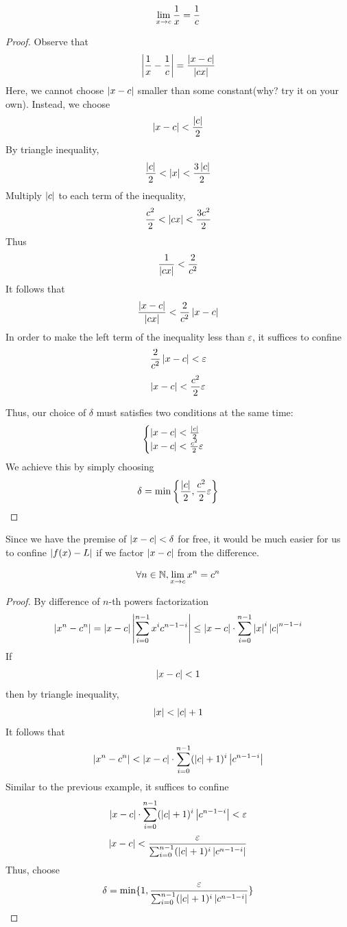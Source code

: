 \documentclass[a4paper,12pt]{article}
\begin{document}
\newpage
\begin{example}[Harder]
    \[\lim_{x\rightarrow c} {\frac{1}{x}}=\frac{1}{c}\]
    \begin{proof}        
        Observe that
        \[\left\lvert \frac{1}{x }-\frac{1}{c}\right\rvert=\frac{\left\lvert x-c\right\rvert}{\left\lvert cx\right\rvert}\]
        Here, we cannot choose \(\left\lvert x-c\right\rvert\) smaller than some constant(why? try it on your own). Instead,
        we choose \[\left\lvert x-c\right\rvert<\frac{\left\lvert c \right\rvert}{2 }\]
        By triangle inequality,
        \[\frac{\left\lvert c \right\rvert}{2 }<\left\lvert x\right\rvert<\frac{3\left\lvert c \right\rvert}{2 }\]
        Multiply \(\left\lvert c\right\rvert\) to each term of the inequality,
        \[\frac{c^2}{2 }<\left\lvert cx\right\rvert<\frac{3c^2}{2 }\]
        Thus
        \[\frac{1 }{\left\lvert cx \right\rvert}<\frac{2 }{c^2 }\]
        It follows that 
        \[\frac{\left\lvert x-c \right\rvert}{\left\lvert cx \right\rvert}<\frac{2}{c^2}\left\lvert x-c \right\rvert\]
        In order to make the left term of the inequality less than \(\varepsilon\), 
        it suffices to confine 
        \[\frac{2}{c^2}\left\lvert x-c\right\rvert<\varepsilon\]
        \[\left\lvert x-c\right\rvert<\frac{c^2}{2}\varepsilon\]

        Thus, our choice of \(\delta\) must satisfies two conditions at the same time:
        \begin{equation*}
            \begin{cases}
                \left\lvert x-c\right\rvert<\frac{\left\lvert c \right\rvert}{2 } \\
                \left\lvert x-c\right\rvert<\frac{c^2}{2}\varepsilon
            \end{cases}
        \end{equation*}
        We achieve this by simply choosing
        \[\delta=\min\left\{\frac{\left\lvert c \right\rvert}{2 },\frac{c^2}{2}\varepsilon\right\}\]

    \end{proof}
\end{example}

\begin{remark}
    Since we have the premise of \(\left\lvert x-c \right\rvert<\delta\) for free, it would be much easier for us to 
    confine \(\left\lvert f(x)-L\right\rvert\) if we factor \(\left\lvert x-c\right\rvert\) from the difference.
\end{remark}

\newpage

\begin{example}
    \[\forall n\in\mathbb{N}, \lim_{x\rightarrow c } {x^n }=c^n\]
    \begin{proof}
        By difference of \(n\)-th powers factorization
        \[\left\lvert x^n-c^n \right\rvert=\left\lvert x-c\right\rvert\left\lvert \sum_{i=0}^{n-1 }x^i c^{n-1-i}\right\rvert\le \left\lvert x-c \right\rvert\cdot\sum_{i=0}^{n-1 }\left\lvert x\right\rvert^i \left\lvert c\right\rvert^{n-1-i}\]
        If \[\left\lvert x-c \right\rvert<1\]
        then by triangle inequality,
        \[\left\lvert x \right\rvert<\left\lvert c \right\rvert+1\]
        It follows that
        \[\left\lvert x^n-c^n\right\rvert<\left\lvert x-c\right\rvert\cdot\sum_{i=0}^{n-1 }(\left\lvert c\right\rvert+1)^i \left\lvert c^{n-1-i}\right\rvert\]
        Similar to the previous example, it suffices to confine 
        \[\left\lvert x-c\right\rvert\cdot\sum_{i=0}^{n-1 }(\left\lvert c\right\rvert+1)^i \left\lvert c^{n-1-i}\right\rvert<\varepsilon\] 
        \[\left\lvert x-c\right\rvert<\frac{\varepsilon}{\sum_{i=0}^{n-1 }(\left\lvert c\right\rvert+1)^i \left\lvert c^{n-1-i}\right\rvert}\]
        Thus, choose 
        \[\delta =\min\{1, \frac{\varepsilon}{\sum_{i=0}^{n-1 }(\left\lvert c\right\rvert+1)^i \left\lvert c^{n-1-i}\right\rvert}\}\]
    \end{proof}
\end{example}
\end{document}
